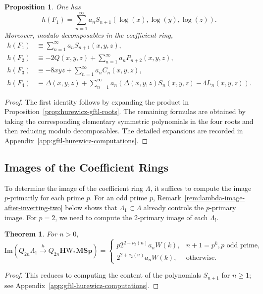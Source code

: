 \documentclass[a4paper]{amsart}
\theoremstyle{plain}
\newtheorem{theorem}[subsubsection]{Theorem}
\newtheorem{proposition}[subsubsection]{Proposition}
\theoremstyle{definition}
\newcommand{\MSp}{\mathbf{MSp}}
\newcommand{\HW}{\mathbf{H}\mathrm{W}}
\renewcommand{\ge}{\geqslant}
\begin{document}
\begin{proposition}\label{prop:hurewicz-indecomposable-formulas}
	One has
	\[
		h(F_1)=\sum_{n=1}^{\infty} a_n S_{n+1} \left(\log(x), \log(y), \log(z)\right).
	\]
	Moreover, modulo decomposables in the coefficient ring,
	\[
		\begin{aligned}
			h(F_1) & \equiv \sum_{n=1}^{\infty} a_n S_{n+1} \left(x, y, z\right),                                 \\
			h(F_2) & \equiv -2Q(x,y,z)+\sum_{n=1}^{\infty}a_n P_{n+2}(x,y,z),                                     \\
			h(F_3) & \equiv -8xyz+\sum_{n=1}^{\infty} a_n C_n(x,y,z),                                             \\
			h(F_4) & \equiv \Delta(x,y,z)+\sum_{n=1}^{\infty}a_n\left(\Delta(x,y,z)S_n(x,y,z)-4L_n(x,y,z)\right).
		\end{aligned}
	\]
\end{proposition}
\begin{proof}
	The first identity follows by expanding the product in Proposition~\ref{prop:hurewicz-gftl-roots}. The remaining formulas are obtained by taking the corresponding elementary symmetric polynomials in the four roots and then reducing modulo decomposables. The detailed expansions are recorded in Appendix~\ref{app:gftl-hurewicz-computations}.
\end{proof}

\subsection{Images of the Coefficient Rings}
To determine the image of the coefficient ring $\Lambda$, it suffices to compute the image $p$-primarily for each prime $p$. For an odd prime $p$, Remark~\ref{rem:lambda-image-after-inverting-two} below shows that $\Lambda_1 \subset \Lambda$ already controls the $p$-primary image. For $p=2$, we need to compute the $2$-primary image of each $\Lambda_l$.

\begin{theorem} \label{thm:lambda-one-hurewicz-image}
	For $n > 0$,
	\[
		\mathrm{Im} \left(Q_{2n} \Lambda_1 \xrightarrow{h} Q_{2n} \HW_*\MSp\right) = \begin{cases}
			p 2^{2+\nu_2(n)} a_n W(k), & n+1 = p^{k}, p \text{ odd prime}, \\
			2^{2+\nu_2(n)} a_n W(k),   & \text{otherwise.}
		\end{cases}
	\]
\end{theorem}
\begin{proof}
	This reduces to computing the content of the polynomials $S_{n+1}$ for $n\ge 1$; see Appendix~\ref{app:gftl-hurewicz-computations}.
\end{proof}
\end{document}
